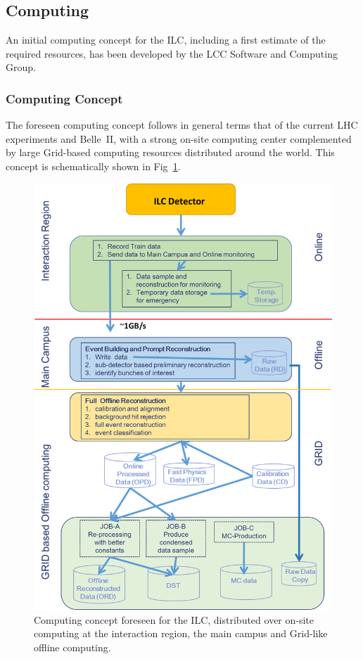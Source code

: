 \subsection{Computing}

An initial computing concept for the ILC, including a first estimate of the required resources, has been developed by the LCC Software and Computing Group.

\subsubsection{Computing Concept}

The foreseen computing concept follows in general terms that of the current LHC experiments and Belle~II, with a strong on-site computing
center complemented by large Grid-based computing resources distributed around the world. This concept is schematically shown in
Fig~\ref{fig:computing_scheme}.

\begin{figure}
\begin{center}
\includegraphics[width=0.6\hsize]{chapters/figures/ILC_computing_scheme.png}
\end{center}
\caption{Computing concept foreseen for the ILC, distributed over on-site computing at the interaction region, the main campus and Grid-like
  offline computing.}
\label{fig:computing_scheme}
\end{figure}

